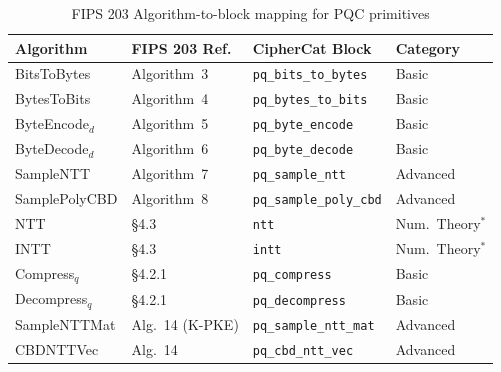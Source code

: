 \documentclass[preprint,12pt,a4paper]{elsarticle}
\begin{document}
\begin{table}[htbp]
	\centering
	\caption{FIPS 203 Algorithm-to-block mapping for PQC primitives}
	\label{tab:fips203_mapping}
	\footnotesize
	\begin{tabular}{|l|l|l|l|}
		\hline
		\textbf{Algorithm}                  & \textbf{FIPS 203 Ref.} & \textbf{CipherCat Block}           & \textbf{Category}                           \\
		\hline
		BitsToBytes                         & Algorithm~3            & \texttt{pq\_bits\_to\_bytes}       & Basic                                       \\
		BytesToBits                         & Algorithm~4            & \texttt{pq\_bytes\_to\_bits}       & Basic                                       \\
		ByteEncode$_d$                      & Algorithm~5            & \texttt{pq\_byte\_encode}          & Basic                                       \\
		ByteDecode$_d$                      & Algorithm~6            & \texttt{pq\_byte\_decode}          & Basic                                       \\
		SampleNTT                           & Algorithm~7            & \texttt{pq\_sample\_ntt}           & Advanced                                    \\
		SamplePolyCBD                       & Algorithm~8            & \texttt{pq\_sample\_poly\_cbd}     & Advanced                                    \\
		NTT                                 & \S4.3                  & \texttt{ntt}                       & Num.\ Theory$^\ast$                         \\
		INTT                                & \S4.3                  & \texttt{intt}                      & Num.\ Theory$^\ast$                         \\
		Compress$_q$                        & \S4.2.1                & \texttt{pq\_compress}              & Basic                                       \\
		Decompress$_q$                      & \S4.2.1                & \texttt{pq\_decompress}            & Basic                                       \\
		SampleNTTMat                        & Alg.~14 (K-PKE)        & \texttt{pq\_sample\_ntt\_mat}      & Advanced                                    \\
		CBDNTTVec                           & Alg.~14                & \texttt{pq\_cbd\_ntt\_vec}         & Advanced                                    \\

\end{tabular}
\end{table}
\end{document}
